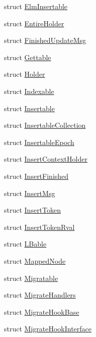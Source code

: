 \begin{DoxyCompactItemize}
struct \hyperlink{structvt_1_1vrt_1_1collection_1_1_elm_insertable}{Elm\+Insertable}
\item 
struct \hyperlink{structvt_1_1vrt_1_1collection_1_1_entire_holder}{Entire\+Holder}
\item 
struct \hyperlink{structvt_1_1vrt_1_1collection_1_1_finished_update_msg}{Finished\+Update\+Msg}
\item 
struct \hyperlink{structvt_1_1vrt_1_1collection_1_1_gettable}{Gettable}
\item 
struct \hyperlink{structvt_1_1vrt_1_1collection_1_1_holder}{Holder}
\item 
struct \hyperlink{structvt_1_1vrt_1_1collection_1_1_indexable}{Indexable}
\item 
struct \hyperlink{structvt_1_1vrt_1_1collection_1_1_insertable}{Insertable}
\item 
struct \hyperlink{structvt_1_1vrt_1_1collection_1_1_insertable_collection}{Insertable\+Collection}
\item 
struct \hyperlink{structvt_1_1vrt_1_1collection_1_1_insertable_epoch}{Insertable\+Epoch}
\item 
struct \hyperlink{structvt_1_1vrt_1_1collection_1_1_insert_context_holder}{Insert\+Context\+Holder}
\item 
struct \hyperlink{structvt_1_1vrt_1_1collection_1_1_insert_finished}{Insert\+Finished}
\item 
struct \hyperlink{structvt_1_1vrt_1_1collection_1_1_insert_msg}{Insert\+Msg}
\item 
struct \hyperlink{structvt_1_1vrt_1_1collection_1_1_insert_token}{Insert\+Token}
\item 
struct \hyperlink{structvt_1_1vrt_1_1collection_1_1_insert_token_rval}{Insert\+Token\+Rval}
\item 
struct \hyperlink{structvt_1_1vrt_1_1collection_1_1_l_bable}{L\+Bable}
\item 
struct \hyperlink{structvt_1_1vrt_1_1collection_1_1_mapped_node}{Mapped\+Node}
\item 
struct \hyperlink{structvt_1_1vrt_1_1collection_1_1_migratable}{Migratable}
\item 
struct \hyperlink{structvt_1_1vrt_1_1collection_1_1_migrate_handlers}{Migrate\+Handlers}
\item 
struct \hyperlink{structvt_1_1vrt_1_1collection_1_1_migrate_hook_base}{Migrate\+Hook\+Base}
\item 
struct \hyperlink{structvt_1_1vrt_1_1collection_1_1_migrate_hook_interface}{Migrate\+Hook\+Interface}
\item 

\end{DoxyCompactItemize}
